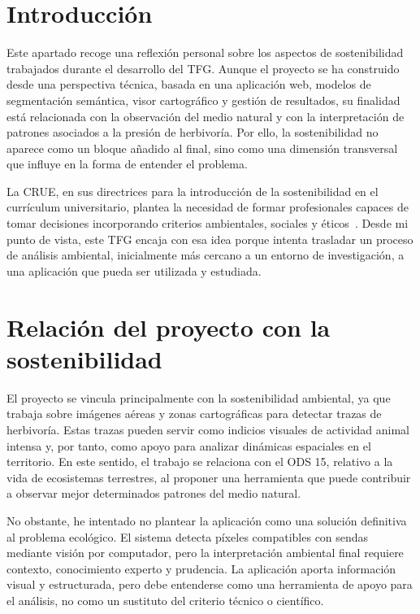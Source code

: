 
\section{Introducción}

Este apartado recoge una reflexión personal sobre los aspectos de sostenibilidad trabajados durante el desarrollo del TFG. Aunque el proyecto se ha construido desde una perspectiva técnica, basada en una aplicación web, modelos de segmentación semántica, visor cartográfico y gestión de resultados, su finalidad está relacionada con la observación del medio natural y con la interpretación de patrones asociados a la presión de herbivoría. Por ello, la sostenibilidad no aparece como un bloque añadido al final, sino como una dimensión transversal que influye en la forma de entender el problema.

La CRUE, en sus directrices para la introducción de la sostenibilidad en el currículum universitario, plantea la necesidad de formar profesionales capaces de tomar decisiones incorporando criterios ambientales, sociales y éticos~\cite{crue2012sostenibilidad}. Desde mi punto de vista, este TFG encaja con esa idea porque intenta trasladar un proceso de análisis ambiental, inicialmente más cercano a un entorno de investigación, a una aplicación que pueda ser utilizada y estudiada.

\section{Relación del proyecto con la sostenibilidad}

El proyecto se vincula principalmente con la sostenibilidad ambiental, ya que trabaja sobre imágenes aéreas y zonas cartográficas para detectar trazas de herbivoría. Estas trazas pueden servir como indicios visuales de actividad animal intensa y, por tanto, como apoyo para analizar dinámicas espaciales en el territorio. En este sentido, el trabajo se relaciona con el ODS 15, relativo a la vida de ecosistemas terrestres, al proponer una herramienta que puede contribuir a observar mejor determinados patrones del medio natural.

No obstante, he intentado no plantear la aplicación como una solución definitiva al problema ecológico. El sistema detecta píxeles compatibles con sendas mediante visión por computador, pero la interpretación ambiental final requiere contexto, conocimiento experto y prudencia. La aplicación aporta información visual y estructurada, pero debe entenderse como una herramienta de apoyo para el análisis, no como un sustituto del criterio técnico o científico.

